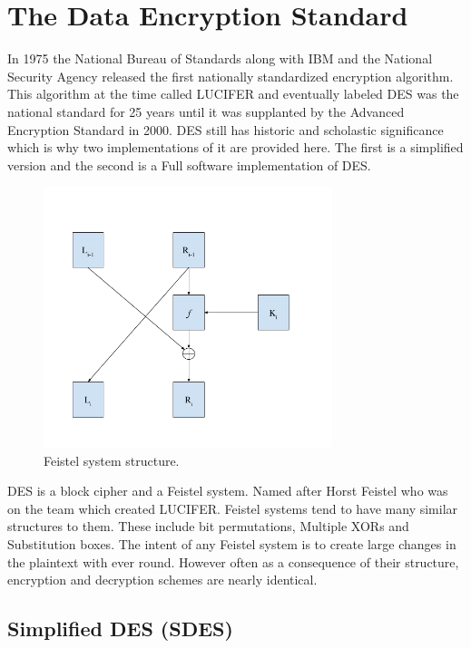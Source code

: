 

\chapter{The Data Encryption Standard}

In 1975 the National Bureau of Standards along with IBM and the National Security Agency released the first nationally standardized encryption algorithm.
This algorithm at the time called LUCIFER and eventually labeled DES was the national standard for 25 years until it was supplanted by the Advanced Encryption Standard in 2000.
DES still has historic and scholastic significance which is why two implementations of it are provided here.
The first is a simplified version and the second is a Full software implementation of DES.

\begin{figure}[ht]
\begin{center}
\includegraphics[width=0.75\textwidth]{./feistel}
\end{center}
\caption{Feistel system structure.}
\end{figure}

DES is a block cipher and a Feistel system. 
Named after Horst Feistel who was on the team which created LUCIFER.
Feistel systems tend to have many similar structures to them.
These include bit permutations, Multiple XORs and Substitution boxes.
The intent of any Feistel system is to create large changes in the plaintext with ever round.
However often as a consequence of their structure, encryption and decryption schemes are nearly identical.


\section{Simplified DES (SDES) }

